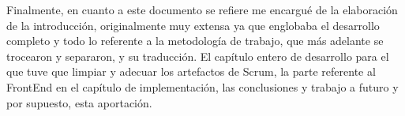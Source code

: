 Finalmente, en cuanto a este documento se refiere me encargué de la elaboración de la introducción, originalmente muy extensa ya que englobaba el desarrollo completo y todo lo referente a la metodología de trabajo, que más adelante se trocearon y separaron, y su traducción. El capítulo entero de desarrollo para el que tuve que limpiar y adecuar los artefactos de Scrum, la parte referente al FrontEnd en el capítulo de implementación, las conclusiones y trabajo a futuro y por supuesto, esta aportación.

